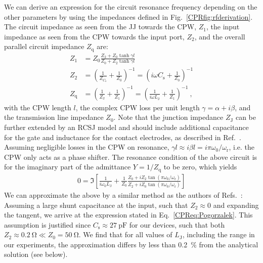 We can derive an expression for the circuit resonance frequency depending on the other parameters by using the impedances defined in Fig.~\ref{CPRfig:rfderivation}.
%
The circuit impedance as seen from the JJ towards the CPW, $Z_1$, the input impedance as seen from the CPW towards the input port, $Z_2$, and the overall parallel circuit impedance $Z_\text{q}$ are:
%
\begin{align}
Z_1 &= Z_0 \frac{Z_2+Z_0\tanh\gamma l}{Z_0+Z_2\tanh\gamma l} \\
Z_2 &= \left(\frac{1}{Z_{C_\text{s}}}+\frac{1}{Z_0}\right)^{-1} = \left(i\omega C_\text{s}+\frac{1}{Z_0}\right)^{-1} \\
Z_\text{q} &= \left(\frac{1}{Z_\text{J}}+\frac{1}{Z_1}\right)^{-1} = \left(\frac{1}{i\omega L_\text{J}}+\frac{1}{Z_1}\right)^{-1}\ ,
\end{align}
%
with the CPW length $l$, the complex CPW loss per unit length $\gamma=\alpha+i\beta$, and the transmission line impedance $Z_0$.
%
Note that the junction impedance $Z_\text{J}$ can be further extended by an RCSJ model and should include additional capacitance for the gate and inductance for the contact electrodes, as described in Ref.~\cite{schmidtBallisticGrapheneSuperconducting2018}.
%
Assuming negligible losses in the CPW on resonance, $\gamma l\approx i\beta l = i\pi\omega_0/\omega_\text{r}$, i.e. the CPW only acts as a phase shifter.
%
The resonance condition of the above circuit is for the imaginary part of the admittance $Y=1/Z_\text{q}$ to be zero, which yields
%
\begin{align}
0 = \Im \left[ \frac{1}{i\omega_0 L_\text{J}} + \frac{1}{Z_0}\frac{Z_0+iZ_2\tan\left(\pi\omega_0/\omega_\text{r}\right)}{Z_2+iZ_0\tan\left(\pi\omega_0/\omega_\text{r}\right)}\right]
\label{CPReq:SolAnalytical}
\end{align}
%
%
We can approximate the above by a similar method as the authors of Refs.~\cite{wallquistSelectiveCouplingSuperconducting2006a,wustmannParametricResonanceTunable2013,pogorzalekHystereticFluxResponse2017}:
%
Assuming a large shunt capacitance at the input, such that $Z_2\approx 0$ and expanding the tangent, we arrive at the expression stated in Eq.~\ref{CPReq:Pogorzalek}.
%
This assumption is justified since $C_\text{s}\approx\SI{27}{\pico\farad}$ for our devices, such that both $Z_2\approx \SI{0.2}{\ohm} \ll Z_0=\SI{50}{\ohm}$.
%
We find that for all values of $L_\text{J}$, including the range in our experiments, the approximation differs by less than \SI{0.2}{\percent} from the analytical solution (see below).


